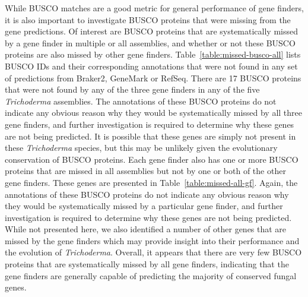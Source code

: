 While BUSCO matches are a good metric for general performance of gene
finders, it is also important to investigate BUSCO proteins that were missing from the gene predictions. Of interest are BUSCO proteins that are systematically missed by a gene finder in multiple or all assemblies, and whether or not these BUSCO proteins are also missed by other gene finders. Table~\ref{table:missed-busco-all} lists BUSCO IDs and their corresponding annotations that were not found in any set of predictions from Braker2, GeneMark or RefSeq. There are 17 BUSCO proteins that were not found by any of the three gene finders in any of the five \textit{Trichoderma} assemblies. The annotations of these BUSCO proteins do not indicate any obvious reason why they would be systematically missed by all three gene finders, and further investigation is required to determine why these genes are not being predicted. It is possible that these genes are simply not present in these \textit{Trichoderma} species, but this may be unlikely given the evolutionary conservation of BUSCO proteins. Each gene finder also has one or more BUSCO proteins that are missed in all assemblies but not by one or both of the other gene finders. These genes are presented in Table~\ref{table:missed-all-gf}. Again, the annotations of these BUSCO proteins do not indicate any obvious reason why they would be systematically missed by a particular gene finder, and further investigation is required to determine why these genes are not being predicted. While not presented here, we also identified a number of other genes that are missed by the gene finders which may provide insight into their performance and the evolution of \textit{Trichoderma}. Overall, it appears that there are very few BUSCO proteins that are systematically missed by all gene finders, indicating that the gene finders are generally capable of predicting the majority of conserved fungal genes.


